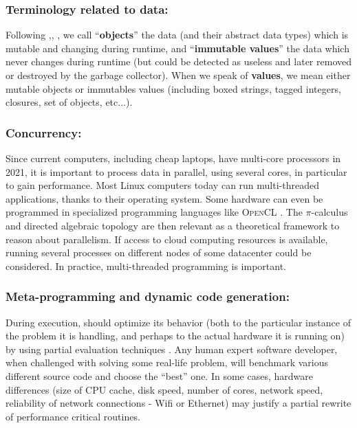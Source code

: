 \documentclass{svproc}
\begin{document}
\subsubsection{Terminology related to data:} Following
\cite{abadi:2012:theory-objects},\linebreak\cite{hindley:2008:lambda}, 
\cite{queinnec:2003:lisp}, we call
``\textbf{objects}'' the data (and their abstract data types) which is
mutable and changing during runtime, and ``\textbf{immutable values}''
the data which never changes during runtime (but could be detected as
useless and later removed or destroyed by the garbage collector). When
we speak of \textbf{\RefPerSys{} values}, we mean either mutable
objects or immutables values (including boxed strings, tagged
integers, closures, set of objects, etc...).

\subsubsection{Concurrency:}
Since current computers, including cheap laptops, have multi-core
processors in 2021, it is important to process data in parallel, using
several cores, in particular to gain performance. Most Linux computers
today can run multi-threaded applications, thanks to their operating
system\linebreak \cite{Arpaci-Dusseau:2018:OSBook}. Some hardware can even be
programmed in specialized programming languages like \textsc{OpenCL}\linebreak
\cite{kaeli:2015:heterogeneous-opencl}. The $\pi$-calculus\linebreak
\cite{sangiorgi:2003:pi-calculus} and directed algebraic topology\linebreak
\cite{fajstrup:2016:directed} are then relevant as a theoretical
framework to reason about parallelism. If access to cloud computing
resources is available, running several \RefPerSys{} processes on
different nodes of some datacenter could be considered. In practice,
multi-threaded programming \cite{butenhof:1997:programming} is
important.

\subsubsection{Meta-programming and dynamic code generation:}
During execution, \RefPerSys{} should optimize its behavior (both to
the particular instance of the problem it is handling, and perhaps to
the actual hardware it is running on) by using partial evaluation
techniques \cite{futamura:1999:partial-evaluation}. Any human expert
software developer, when challenged with solving some real-life
problem, will benchmark various different source code and choose the
``best'' one. In some cases, hardware differences (size of CPU cache,
disk speed, number of cores, network speed, reliability of network
connections - Wifi or Ethernet) may justify a partial rewrite of
performance critical routines.
\end{document}
